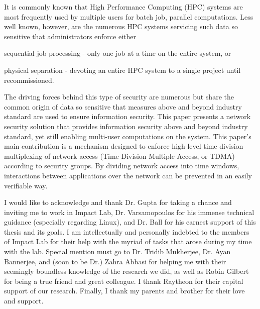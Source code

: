 \documentclass[oneside,12pt]{memoir}
\begin{document}
\pagestyle{plain}  %
\frontmatter
\thetitlepage

\setcounter{page}{1}
\asuabstract 
It is commonly known that High Performance Computing (HPC) systems are most frequently used by multiple users for batch job, parallel computations. Less well known, however, are the numerous HPC systems servicing such data so sensitive that administrators enforce either \begin{inparaenum} 
\item sequential job processing - only one job at a time on the entire system, or
\item physical separation - devoting an entire HPC system to a single project until recommissioned.
\end{inparaenum}
The driving forces behind this type of security are numerous but share the common origin of data so sensitive that measures above and beyond industry standard are used to ensure information security. This paper presents a network security solution that provides information security above and beyond industry standard, yet still enabling multi-user computations on the system. This paper's main contribution is a mechanism designed to enforce high level time division multiplexing of network access (Time Division Multiple Access, or TDMA) according to security groups. By dividing network access into time windows, interactions between applications over the network can be prevented in an easily verifiable way. 

\asuacknowledgements
{I would like to acknowledge and thank Dr. Gupta for taking a chance and inviting me to work in Impact Lab, Dr. Varsamopoulos for his immense technical guidance (especially regarding Linux), and Dr. Ball for his earnest support of this thesis and its goals. I am intellectually and personally indebted to the members of Impact Lab for their help with the myriad of tasks that arose during my time with the lab. Special mention must go to Dr. Tridib Mukherjee, Dr. Ayan Bannerjee, and (soon to be Dr.) Zahra Abbasi for helping me with their seemingly boundless knowledge of the research we did, as well as Robin Gilbert for being a true friend and great colleague. I thank Raytheon for their capital support of our research. Finally, I thank my parents and brother for their love and support.
}

	\newpage
\vspace*{\fill}
\begingroup
\hspace*{\fill}
\hspace*{\fill}
\endgroup
\vspace*{\fill}
\end{document}
